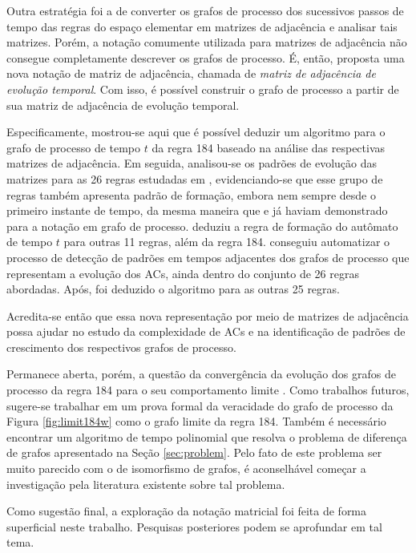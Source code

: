 \documentclass[12pt,a4paper]{article}
\begin{document}
Outra estratégia foi a de converter os grafos de processo dos sucessivos
passos de tempo das regras do espaço elementar em matrizes de adjacência e analisar
tais matrizes. Porém, a notação comumente utilizada para matrizes de adjacência
não consegue completamente descrever os grafos de processo. É, então, proposta uma
nova notação de matriz de adjacência, chamada de \textit{matriz de
adjacência de evolução temporal}. Com isso, é possível construir o
grafo de processo a partir de sua matriz de adjacência de evolução temporal.

Especificamente, mostrou-se aqui que é possível deduzir um algoritmo para o
grafo de processo de tempo $t$ da regra 184 baseado na análise das respectivas
matrizes de adjacência. Em seguida, analisou-se
os padrões de evolução das matrizes para as 26 regras estudadas em
, evidenciando-se que esse grupo de regras
também apresenta padrão de formação, embora nem sempre desde o primeiro
instante de tempo, da mesma maneira que  e
 já haviam demonstrado para a notação em grafo de processo.
 deduziu a regra de formação do autômato de
tempo $t$ para outras 11 regras, além da regra 184. 
conseguiu automatizar o processo de detecção de padrões em tempos adjacentes
dos grafos de processo que representam a evolução dos ACs, ainda dentro do
conjunto de 26 regras abordadas. Após, foi deduzido o algoritmo para as
outras 25 regras.

Acredita-se então que essa nova representação por meio de matrizes de
adjacência possa ajudar no estudo da complexidade de ACs e na identificação
de padrões de crescimento dos respectivos grafos de processo.

Permanece aberta, porém, a questão da convergência da evolução dos grafos
de processo da regra 184 para o seu comportamento limite .
Como trabalhos futuros, sugere-se trabalhar em um prova formal da veracidade
do grafo de processo da Figura \ref{fig:limit184w} como o grafo limite da regra
184. Também é necessário encontrar um algoritmo de tempo polinomial que resolva
o problema de diferença de grafos apresentado na Seção \ref{sec:problem}.
Pelo fato de este problema ser muito parecido com o de isomorfismo de grafos,
é aconselhável começar a investigação pela literatura existente sobre tal
problema.

Como sugestão final, a exploração da notação matricial foi feita de forma
superficial neste trabalho.  Pesquisas posteriores podem se aprofundar em
tal tema.
\end{document}
